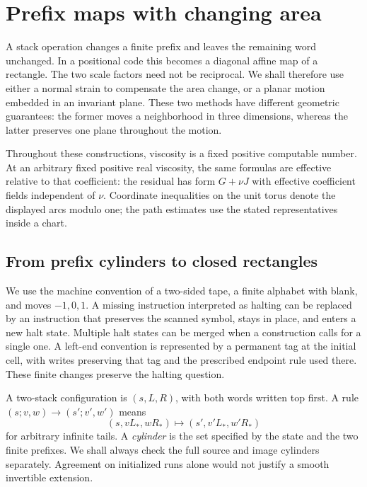 \section{Prefix maps with changing area}\label{sec:sa-sheets}
A stack operation changes a finite prefix and leaves the remaining word
unchanged.  In a positional code this becomes a diagonal affine map of
a rectangle.  The two scale factors need not be reciprocal.  We shall
therefore use either a normal strain to compensate the area change, or
a planar motion embedded in an invariant plane.  These two methods have
different geometric guarantees: the former moves a neighborhood in three
dimensions, whereas the latter preserves one plane throughout the motion.

Throughout these constructions, viscosity is a fixed positive computable
number.  At an arbitrary fixed positive real viscosity, the same formulas
are effective relative to that coefficient: the residual has form
$G+\nu J$ with effective coefficient fields independent of $\nu$.
Coordinate inequalities on the unit torus denote the displayed arcs modulo
one; the path estimates use the stated representatives inside a chart.

\subsection{From prefix cylinders to closed rectangles}\label{subsec:sa-local}
We use the machine convention of a two-sided tape, a finite alphabet with
blank, and moves $-1,0,1$.  A missing instruction interpreted as halting
can be replaced by an instruction that preserves the scanned symbol,
stays in place, and enters a new halt state.  Multiple halt states can
be merged when a construction calls for a single one.  A left-end
convention is represented by a permanent tag at the initial cell, with
writes preserving that tag and the prescribed endpoint rule used there.
These finite changes preserve the halting question.

A two-stack configuration is $(s,L,R)$, with both words written top first.
A rule $(s;v,w)\to(s';v',w')$ means
\[
 (s,vL_*,wR_*)\longmapsto(s',v'L_*,w'R_*)
\]
for arbitrary infinite tails.  A \emph{cylinder} is the set specified by
the state and the two finite prefixes.  We shall always check the full
source and image cylinders separately.  Agreement on initialized runs
alone would not justify a smooth invertible extension.

